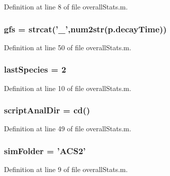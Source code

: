Definition at line 8 of file overall\-Stats.\-m.

\hypertarget{a00026_a5714ee99d309183e59b051e92e5a44d1}{
\subsubsection[{gfs}]{\setlength{\rightskip}{0pt plus 5cm}gfs = strcat('\-\_\-',num2str({\bf p.\-decay\-Time}))}}\label{a00026_a5714ee99d309183e59b051e92e5a44d1}


Definition at line 50 of file overall\-Stats.\-m.

\hypertarget{a00026_aad7be196243f3c9ca83dfee7c9111014}{
\subsubsection[{last\-Species}]{ last\-Species = 2}}\label{a00026_aad7be196243f3c9ca83dfee7c9111014}


Definition at line 10 of file overall\-Stats.\-m.

\hypertarget{a00026_a2a07fff00b80967a40ae67d91fd31cb4}{
\subsubsection[{script\-Anal\-Dir}]{ script\-Anal\-Dir = {\bf cd}()}}\label{a00026_a2a07fff00b80967a40ae67d91fd31cb4}


Definition at line 49 of file overall\-Stats.\-m.

\hypertarget{a00026_aa671e3345005bd599e662bcaa115b18a}{
\subsubsection[{sim\-Folder}]{ sim\-Folder = 'A\-C\-S2'}}\label{a00026_aa671e3345005bd599e662bcaa115b18a}


Definition at line 9 of file overall\-Stats.\-m.


